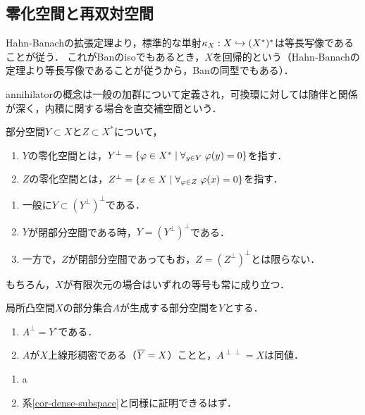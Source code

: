\documentclass[uplatex,dvipdfmx]{jsreport}
\begin{document}
\subsection{零化空間と再双対空間}

\begin{tcolorbox}[colframe=ForestGreen, colback=ForestGreen!10!white,breakable,colbacktitle=ForestGreen!40!white,coltitle=black,fonttitle=\bfseries\sffamily,
title=]
    Hahn-Banachの拡張定理より，標準的な単射$\kappa_X:X\hookrightarrow (X^*)^*$は等長写像であることが従う．
    これがBanのisoでもあるとき，$X$を回帰的という（Hahn-Banachの定理より等長写像であることが従うから，Banの同型でもある）．

    annihilatorの概念は一般の加群について定義され，可換環に対しては随伴と関係が深く，内積に関する場合を直交補空間という．
\end{tcolorbox}

\begin{definition}[annihilator]
    部分空間$Y\subset X$と$Z\subset X^*$について，
    \begin{enumerate}
        \item $Y$の零化空間とは，$Y^\perp=\left\{\varphi\in X^*\mid\forall_{y\in Y}\;\varphi(y)=0\right\}$を指す．
        \item $Z$の零化空間とは，$Z^\perp=\left\{x\in X\mid\forall_{\varphi\in Z}\;\varphi(x)=0\right\}$を指す．
    \end{enumerate}
\end{definition}

\begin{lemma}\mbox{}
    \begin{enumerate}
        \item 一般に$Y\subset(Y^\perp)^\perp$である．
        \item $Y$が閉部分空間である時，$Y=(Y^\perp)^\perp$である．
        \item 一方で，$Z$が閉部分空間であってもお，$Z=(Z^\perp)^\perp$とは限らない．
    \end{enumerate}
    もちろん，$X$が有限次元の場合はいずれの等号も常に成り立つ．
\end{lemma}

\begin{proposition}\label{prop-dense-subspace-of-Banach-space}
    局所凸空間$X$の部分集合$A$が生成する部分空間を$Y$とする．
    \begin{enumerate}
        \item $A^\perp=Y^\circ$である．
        \item $A$が$X$上線形稠密である（$\overline{Y}=X$）ことと，$A^{\perp\perp}=X$は同値．
    \end{enumerate}
\end{proposition}
\begin{Proof}\mbox{}
    \begin{enumerate}
        \item a
        \item 系\ref{cor-dense-subspace}と同様に証明できるはず．
    \end{enumerate}
\end{Proof}
\end{document}
